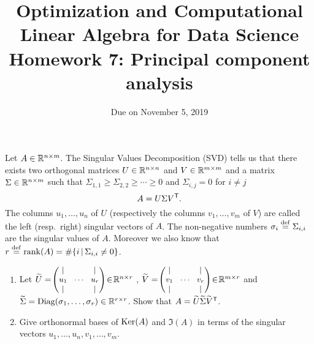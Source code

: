 \documentclass[11pt,nocut]{article}
\title{\vspace{-2.0cm}%
	Optimization and Computational Linear Algebra for Data Science\\
Homework 7: Principal component analysis}
\date{\vspace{-1cm}Due on November 5, 2019}
\begin{document}
\maketitle



\begin{problem}[3 points]
	Let $A \in \mathbb{R}^{n \times m}$. The Singular Values Decomposition (SVD) tells us that there exists two orthogonal matrices $U \in \mathbb{R}^{n \times n}$ and $V \in \mathbb{R}^{m \times m}$ and a matrix $\Sigma \in \mathbb{R}^{n \times m}$ such that $\Sigma_{1,1} \geq \Sigma_{2,2}  \geq \cdots \geq 0$ and $\Sigma_{i,j} = 0$ for $i\neq j$
	$$
	A = U \Sigma V^{{\sf T}}.
	$$
	The columns $u_1, \dots, u_n$ of $U$ (respectively the columns $v_1, \dots, v_m$ of $V$) are called the left (resp.\ right) singular vectors of $A$. The non-negative numbers $\sigma_i \overset{\rm def}{=} \Sigma_{i,i}$ are the singular values of $A$. Moreover we also know that $r \overset{\rm def}{=} {{\rm rank}}(A) = \# \{i \, | \, \Sigma_{i,i} \neq 0 \}$.
	\begin{enumerate}[label=\normalfont(\textbf{\alph*})]
		\item Let 
			$\widetilde{U} = \!
			{\small \begin{pmatrix}
					| & & | \\
					u_1 & \!\cdots\! & u_r \\
					| & & | 
			\end{pmatrix} } \! \in \! \mathbb{R}^{n \times r}$ ,
			$\widetilde{V} = \!
			{\small \begin{pmatrix}
					| & & | \\
					v_1 & \!\cdots\! & v_r \\
					| & & | 
			\end{pmatrix} } \! \in \! \mathbb{R}^{m \times r}$ and
			$\widetilde{\Sigma} = {{\rm Diag}}(\sigma_1, \dots, \sigma_r) \in \mathbb{R}^{r \times r}$.
			Show that $A = \widetilde{U}\widetilde{\Sigma}\widetilde{V}^{{\sf T}}$.
		\item Give orthonormal bases of ${{\rm Ker}}(A)$ and $\Im(A)$ in terms of the singular vectors $u_1, \dots, u_n, v_1, \dots , v_m$.
	\end{enumerate}
\end{problem}

\vspace{1mm}
\end{document}
